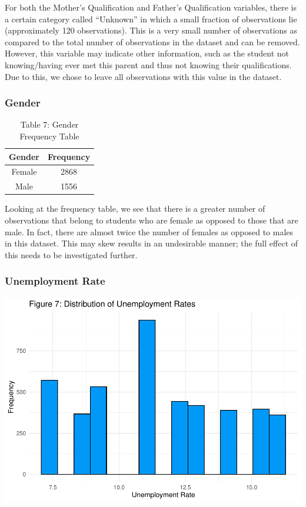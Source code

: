 \documentclass[
]{article}
\begin{document}
For both the Mother's Qualification and Father's Qualification
variables, there is a certain category called ``Unknown'' in which a
small fraction of observations lie (approximately 120 observations).
This is a very small number of observations as compared to the total
number of observations in the dataset and can be removed. However, this
variable may indicate other information, such as the student not
knowing/having ever met this parent and thus not knowing their
qualifications. Due to this, we chose to leave all observations with
this value in the dataset.

\hypertarget{gender}{%
\subsubsection{Gender}\label{gender}}

\begin{table}

\caption{\label{tab:unnamed-chunk-12}Table 7: Gender Frequency Table}
\centering
\begin{tabular}[t]{c|c}
\hline
Gender & Frequency\\
\hline
Female & 2868\\
\hline
Male & 1556\\
\hline
\end{tabular}
\end{table}

Looking at the frequency table, we see that there is a greater number of
observations that belong to students who are female as opposed to those
that are male. In fact, there are almost twice the number of females as
opposed to males in this dataset. This may skew results in an
undesirable manner; the full effect of this needs to be investigated
further.

\hypertarget{unemployment-rate}{%
\subsubsection{Unemployment Rate}\label{unemployment-rate}}

\begin{center}\includegraphics{finalproj_files/figure-latex/unnamed-chunk-13-1} \end{center}
\end{document}
